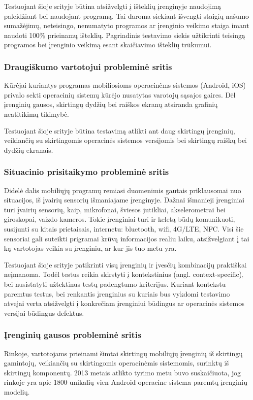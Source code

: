 \documentclass{VUMIFPSkursinis}
\begin{document}
Testuojant šioje srityje būtina atsižvelgti į išteklių įrenginyje naudojimą paleidžiant bei naudojant programą. Tai daroma siekiant išvengti staigių našumo sumažėjimų, neteisingo, nenumatyto programos ar įrenginio veikimo staiga imant naudoti 100\% prieinamų išteklių. Pagrindinis testavimo siekis užtikrinti teisingą programos bei įrenginio veikimą esant skaičiavimo išteklių trūkumui.

\subsubsection{Draugiškumo vartotojui probleminė sritis}
Kūrėjai kuriantys programas mobiliosioms operacinėms sistemos (Android, iOS) privalo sekti operacinių sistemų kūrėjo nusatytas varotojų sąsajos gaires. Dėl įrenginių gausos, skirtingų dydžių bei raiškos ekranų atsiranda grafinių neatitikimų tikimybė. 

Testuojant šioje srityje būtina testavimą atlikti ant daug skirtingų įrenginių, veikiančių su skirtingomis operacinės sistemos versijomis bei skirtingų raiškų bei dydžių ekranais.

\subsubsection{Situacinio prisitaikymo probleminė sritis}
Didelė dalis mobiliųjų programų remiasi duomenimis gautais priklausomai nuo situacijos, iš įvairių sensorių išmaniajame įrenginyje. Dažnai išmanieji įrenginiai turi įvairių sensorių, kaip, mikrofonai, šviesos jutikliai, akselerometrai bei giroskopai, vaizdo kameros. Tokie įrenginiai turi ir keletą būdų komunikuoti, susijunti su kitais prietaisais, internetu: bluetooth, wifi, 4G/LTE, NFC. Visi šie sensoriai gali suteikti prigramai krūvą informacijos realiu laiku, atsižvelgiant į tai ką vartotojas veikia su įrenginiu, ar kur jis tuo metu yra.

Testuojant šioje srityje patikrinti visų įrenginių ir įvesčių kombinacijų praktiškai neįmanoma. Todėl testus reikia skirstyti į kontekstinius (angl. context-specific), bei nusistatyti užtektinus testų padengtumo kriterijus. Kuriant kontekstu paremtus testus, bei renkantis įrenginius su kuriais bus vykdomi testavimo atvejai verta atsižvelgti į konkrečiam įrenginiui būdingus ar operacinės sistemos versijai būdingus defektus. \cite{android_bugs}

\subsubsection{Įrenginių gausos probleminė sritis}
Rinkoje, vartotojams prieinami šimtai skirtingų mobiliųjų įrenginių iš skirtingų gamintojų, veikiančių su skirtingomis operacinėmis sistemomis, surinktų iš skirtingų komponentų. 2013 metais atlikto tyrimo metu buvo suskaičiuota, jog rinkoje yra apie 1800 unikalių vien Android operacine sistema paremtų įrenginių modelių. \cite{Muccini:2012:STM:2663608.2663615}
\end{document}
